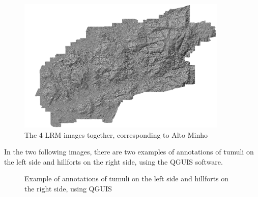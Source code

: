 \begin{figure}[H]
\centering
\includegraphics[width=10cm]{images/LRMfinal.png}
\caption{The 4 LRM images together, corresponding to Alto Minho}
\label{fig:4lrmsjuntas}
\end{figure}
In the two following images, there are two examples of annotations of tumuli on the left side and hillforts on the right side, using the QGUIS software.
\begin{figure}[H]
    \centering
    \qquad
    \caption{Example of annotations of tumuli on the left side and hillforts on the right side, using QGUIS}%
\end{figure}




